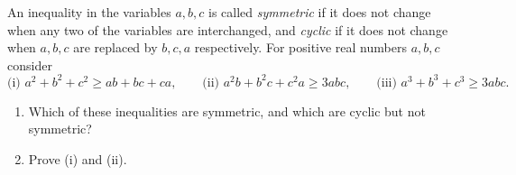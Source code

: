 An inequality in the variables $a,b,c$ is called \emph{symmetric} if it does not change when any two of the variables are interchanged, and \emph{cyclic} if it does not change when $a,b,c$ are replaced by $b,c,a$ respectively. For positive real numbers $a,b,c$ consider
\[
\text{(i) } a^2+b^2+c^2\ge ab+bc+ca,\qquad \text{(ii) } a^2b+b^2c+c^2a\ge3abc,\qquad \text{(iii) } a^3+b^3+c^3\ge3abc .
\]
\begin{enumerate}
\item[(a)] Which of these inequalities are symmetric, and which are cyclic but not symmetric?
\item[(b)] Prove (i) and (ii).
\end{enumerate}

